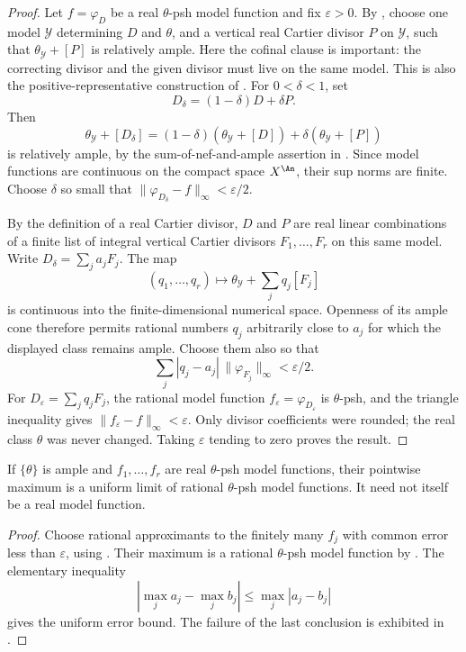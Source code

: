 \begin{proof}
Let $f=\varphi_D$ be a real $\theta$-psh model function and fix
$\varepsilon>0$.  By
, choose one model $\mathcal Y$
determining $D$ and $\theta$, and a vertical real Cartier divisor
$P$ on $\mathcal Y$, such that $\theta_{\mathcal Y}+[P]$ is
relatively ample.  Here the cofinal clause is important: the correcting
divisor and the given divisor must live on the same model.  This is also
the positive-representative construction of
\cite[Proposition~5.2]{BFJ16}.  For $0<\delta<1$, set
\[
 D_\delta=(1-\delta)D+\delta P.
\]
Then
\[
 \theta_{\mathcal Y}+[D_\delta]
 =(1-\delta)(\theta_{\mathcal Y}+[D])
       +\delta(\theta_{\mathcal Y}+[P])
\]
is relatively ample, by the sum-of-nef-and-ample assertion in
.  Since model functions are continuous
on the compact space $X^{\An}$, their sup norms are finite.  Choose
$\delta$ so small that
$\|\varphi_{D_\delta}-f\|_\infty<\varepsilon/2$.

By the definition of a real Cartier divisor, $D$ and $P$ are real
linear combinations of a finite list of integral vertical Cartier divisors
$F_1,\ldots,F_r$ on this same model.  Write
$D_\delta=\sum_j a_jF_j$.  The map
\[
 (q_1,\ldots,q_r)\longmapsto
       \theta_{\mathcal Y}+\sum_jq_j[F_j]
\]
is continuous into the finite-dimensional numerical space.  Openness of
its ample cone therefore permits rational numbers $q_j$ arbitrarily
close to $a_j$ for which the displayed class remains ample.  Choose
them also so that
\[
 \sum_j|q_j-a_j|\,\|\varphi_{F_j}\|_\infty<\varepsilon/2.
\]
For $D_\varepsilon=\sum_jq_jF_j$, the rational model function
$f_\varepsilon=\varphi_{D_\varepsilon}$ is $\theta$-psh, and the
triangle inequality gives $\|f_\varepsilon-f\|_\infty<\varepsilon$.
Only divisor coefficients were rounded; the real class $\theta$ was
never changed.  Taking $\varepsilon$ tending to zero proves the result.
\end{proof}

\begin{corollary}
\label{cor:ch20-real-max-uniform-approximation}
If $\{\theta\}$ is ample and $f_1,\ldots,f_r$ are real
$\theta$-psh model functions, their pointwise maximum is a uniform
limit of rational $\theta$-psh model functions.  It need not itself
be a real model function.
\end{corollary}

\begin{proof}
Choose rational approximants to the finitely many $f_j$ with common
error less than $\varepsilon$, using
.  Their maximum is a
rational $\theta$-psh model function by .
The elementary inequality
\[
 \left|\max_j a_j-\max_j b_j\right|\leq\max_j|a_j-b_j|
\]
gives the uniform error bound.  The failure of the last conclusion is
exhibited in .
\end{proof}

